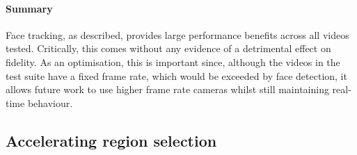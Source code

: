 

\paragraph{Summary}

Face tracking, as described, provides large performance benefits across all videos tested.
Critically, this comes without any evidence of a detrimental effect on fidelity. As an optimisation, this
is important since, although the videos in the test suite have a fixed frame rate, which would be exceeded by face detection, it allows future work to 
use higher frame rate cameras whilst still maintaining real-time behaviour. 

\subsection{Accelerating region selection}

